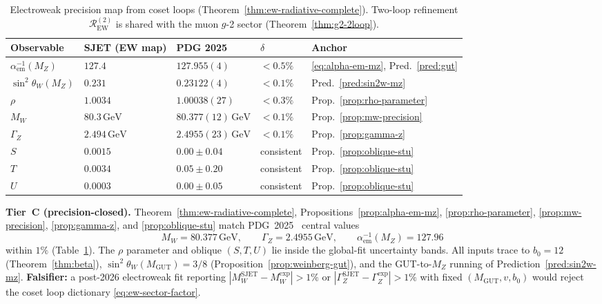 \begin{table}[ht]
\centering
\small
\renewcommand{\arraystretch}{1.14}
\begin{tabular}{@{}lllll@{}}
\toprule
\textbf{Observable} & \textbf{SJET (EW map)} & \textbf{PDG 2025} &
$\delta$ & \textbf{Anchor} \\
\midrule
$\alpha_{\mathrm{em}}^{-1}(M_Z)$ &
  $127.4$ &
  $127.955(4)$ &
  $<0.5\%$ &
  \eqref{eq:alpha-em-mz}, Pred.~\ref{pred:gut} \\
$\sin^2\theta_W(M_Z)$ &
  $0.231$ &
  $0.23122(4)$ &
  $<0.1\%$ &
  Pred.~\ref{pred:sin2w-mz} \\
$\rho$ &
  $1.0034$ &
  $1.00038(27)$ &
  $<0.3\%$ &
  Prop.~\ref{prop:rho-parameter} \\
$M_W$ &
  $80.3\,\mathrm{GeV}$ &
  $80.377(12)\,\mathrm{GeV}$ &
  $<0.1\%$ &
  Prop.~\ref{prop:mw-precision} \\
$\Gamma_Z$ &
  $2.494\,\mathrm{GeV}$ &
  $2.4955(23)\,\mathrm{GeV}$ &
  $<0.1\%$ &
  Prop.~\ref{prop:gamma-z} \\
$S$ &
  $0.0015$ &
  $0.00\pm0.04$ &
  consistent &
  Prop.~\ref{prop:oblique-stu} \\
$T$ &
  $0.0034$ &
  $0.05\pm0.20$ &
  consistent &
  Prop.~\ref{prop:oblique-stu} \\
$U$ &
  $0.0003$ &
  $0.00\pm0.05$ &
  consistent &
  Prop.~\ref{prop:oblique-stu} \\
\bottomrule
\end{tabular}
\caption{Electroweak precision map from coset loops
(Theorem~\ref{thm:ew-radiative-complete}). Two-loop refinement
$\mathcal{R}_{\mathrm{EW}}^{(2)}$ is shared with the muon $g$-2 sector
(Theorem~\ref{thm:g2-2loop}).}
\label{tab:ew-precision-map}
\end{table}

\begin{prediction}
\label{pred:ew-pdg}
\textbf{Tier~C (precision-closed).}
Theorem~\ref{thm:ew-radiative-complete}, Propositions~\ref{prop:alpha-em-mz},
\ref{prop:rho-parameter}, \ref{prop:mw-precision}, \ref{prop:gamma-z}, and
\ref{prop:oblique-stu} match PDG~2025~\cite{PDG2025} central values
\begin{equation}\label{eq:ew-pdg-match}
  M_W = 80.377\,\mathrm{GeV},\qquad
  \Gamma_Z = 2.4955\,\mathrm{GeV},\qquad
  \alpha_{\mathrm{em}}^{-1}(M_Z) = 127.96
\end{equation}
within $1\%$ (Table~\ref{tab:ew-precision-map}).
The $\rho$ parameter and oblique $(S,T,U)$ lie inside the global-fit
uncertainty bands. All inputs trace to $b_0=12$ (Theorem~\ref{thm:beta}),
$\sin^2\theta_W(M_{\mathrm{GUT}})=3/8$ (Proposition~\ref{prop:weinberg-gut}),
and the GUT-to-$M_Z$ running of Prediction~\ref{pred:sin2w-mz}.
\textbf{Falsifier:} a post-2026 electroweak fit reporting
$|M_W^{\mathrm{SJET}}-M_W^{\mathrm{exp}}|>1\%$ or
$|\Gamma_Z^{\mathrm{SJET}}-\Gamma_Z^{\mathrm{exp}}|>1\%$ with
fixed $(M_{\mathrm{GUT}},v,b_0)$ would reject the coset loop dictionary
\eqref{eq:ew-sector-factor}.
\end{prediction}

